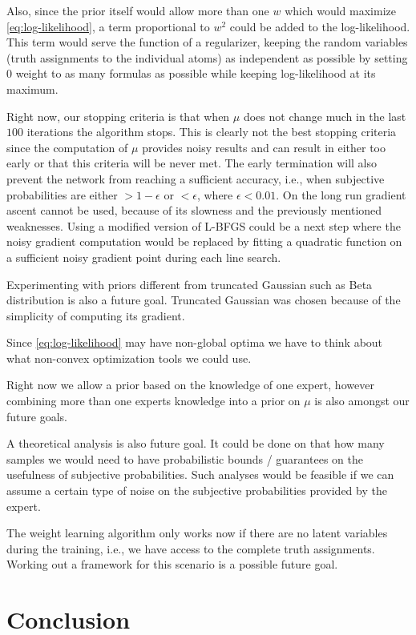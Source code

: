 \documentclass[12pt]{article}
\begin{document}
Also, since the prior itself would allow more than one $w$ which would maximize
\eqref{eq:log-likelihood}, a term proportional to $w^ {2}$ could be added to 
the log-likelihood. This term would serve the function of a regularizer, keeping
the random variables (truth assignments to the individual atoms) as 
independent as possible by setting $0$ weight to as many formulas as 
possible while keeping log-likelihood at its maximum.

Right now, our stopping criteria is that when $\mu$ does not change much in the
last $100$ iterations the algorithm stops. This is clearly not the best stopping
criteria since the computation of $\mu$ provides noisy results and can result
in either too early or that this criteria will be never met. The early 
termination will also prevent the network from reaching a sufficient accuracy,
i.e., when subjective probabilities are either $>1-\epsilon$ or $<\epsilon$, 
where $\epsilon < 0.01$.
On the long run gradient ascent cannot be used, because of its slowness and 
the previously  mentioned weaknesses. Using a modified version of L-BFGS
could be a next step where the noisy gradient computation would be replaced 
by fitting a quadratic function on a sufficient noisy gradient point during 
each line search.

Experimenting with priors different from truncated Gaussian such as Beta 
distribution is also a future goal. Truncated Gaussian was chosen because
of the simplicity of computing its gradient.

Since \eqref{eq:log-likelihood} may have non-global optima we have to think 
about what non-convex optimization tools we could use.

Right now we allow a prior based on the knowledge of one expert, however
combining more than one experts knowledge into a prior on $\mu$ is also amongst
our future goals.

A theoretical analysis is also future goal. It could be done on that how many 
samples we would need to have probabilistic bounds / guarantees on the 
usefulness of subjective probabilities. Such analyses would be feasible if 
we can assume a certain type of noise on the subjective probabilities provided
by the expert.

The weight learning algorithm only works now if there are no latent variables
during the training, i.e., we have access to the complete truth assignments. 
Working out a framework for this scenario is a possible future goal.

\section{Conclusion}
\end{document}
